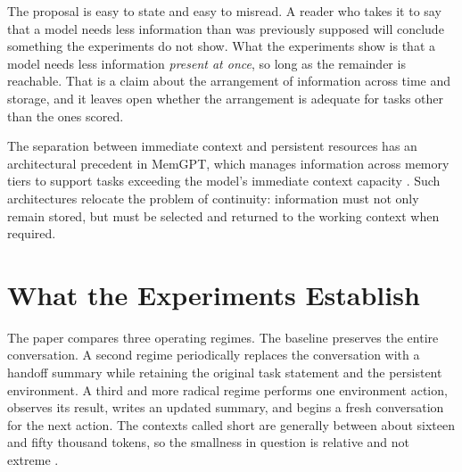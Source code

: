 \documentclass[11pt]{article}
\begin{document}
The proposal is easy to state and easy to misread. A reader who takes it to say that a model needs less information than was previously supposed will conclude something the experiments do not show. What the experiments show is that a model needs less information \emph{present at once}, so long as the remainder is reachable. That is a claim about the arrangement of information across time and storage, and it leaves open whether the arrangement is adequate for tasks other than the ones scored.

The separation between immediate context and persistent resources has an architectural precedent in MemGPT, which manages information across memory tiers to support tasks exceeding the model's immediate context capacity \cite{packer2024}. Such architectures relocate the problem of continuity: information must not only remain stored, but must be selected and returned to the working context when required.

\section{What the Experiments Establish}

The paper compares three operating regimes. The baseline preserves the entire conversation. A second regime periodically replaces the conversation with a handoff summary while retaining the original task statement and the persistent environment. A third and more radical regime performs one environment action, observes its result, writes an updated summary, and begins a fresh conversation for the next action. The contexts called short are generally between about sixteen and fifty thousand tokens, so the smallness in question is relative and not extreme \cite{paper}.
\end{document}
